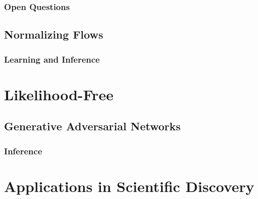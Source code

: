             \subsubsection{Open Questions} %

        \subsection{Normalizing Flows} %

            \subsubsection{Learning and Inference} %

    \section{Likelihood-Free} %

        \subsection{Generative Adversarial Networks} %

            \subsubsection{Inference} %

    \section{Applications in Scientific Discovery} %
